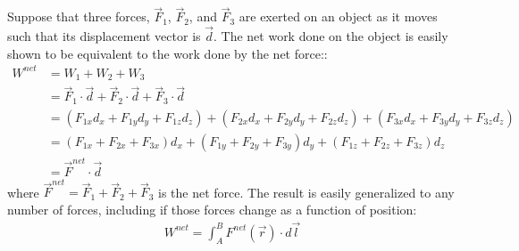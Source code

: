 Suppose that three forces, $\vec F_1$, $\vec F_2$, and $\vec F_3$ are exerted on an object as it moves such that its displacement vector is $\vec d$. The net work done on the object is easily shown to be equivalent to the work done by the net force::
\begin{align*}
W^{net} &= W_1 + W_2 + W_3 \\
&= \vec F_1 \cdot \vec d + \vec F_2 \cdot \vec d  + \vec F_3 \cdot \vec d \\
&=(F_{1x}d_x+F_{1y}d_y+F_{1z}d_z)+ (F_{2x}d_x+F_{2y}d_y+F_{2z}d_z) + (F_{3x}d_x+F_{3y}d_y+F_{3z}d_z)\\
&=(F_{1x} + F_{2x} + F_{3x})d_x+(F_{1y} + F_{2y} + F_{3y})d_y+(F_{1z} + F_{2z} + F_{3z})d_z\\
&=\vec F^{net} \cdot \vec d
\end{align*}
where $\vec F^{net} = \vec F_1 + \vec F_2 + \vec F_3$ is the net force. The result is easily generalized to any number of forces, including if those forces change as a function of position:
\begin{align*}
W^{net} = \int_A^B F^{net}(\vec r) \cdot d\vec l
\end{align*} 

